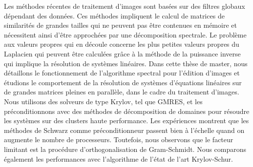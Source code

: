 Les méthodes récentes de traitement d'images sont basées sur des filtres globaux dépendant des données.
Ces méthodes impliquent le calcul de matrices de similarités de grandes tailles qui ne peuvent pas être contenues en mémoire et nécessitent ainsi d'être approchées par une décomposition spectrale.
Le problème aux valeurs propres qui en découle concerne les plus petites valeurs propres du Laplacien qui peuvent être calculées grâce à la méthode de la puissance inverse qui implique la résolution de systèmes linéaires.
Dans cette thèse de master, nous détaillons le fonctionnement de l'algorithme spectral pour l'édition d'images et étudions le comportement de la résolution de systèmes d'équations linéaires sur de grandes matrices pleines en parallèle, dans le cadre du traitement d'images.
Nous utilisons des solveurs de type Krylov, tel que GMRES, et les préconditionnons avec des méthodes de décomposition de domaines pour résoudre les systèmes sur des clusters haute performance.
Les expériences montrent que les méthodes de Schwarz comme préconditionneur passent bien à l'échelle quand on augmente le nombre de processeurs.
Toutefois, nous observons que le facteur limitant est la procédure d'orthogonalisation de Gram-Schmidt.
Nous comparons également les performances avec l'algorithme de l'état de l'art Krylov-Schur.
